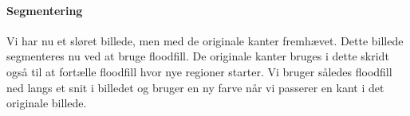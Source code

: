 {\paragraph{Segmentering}
Vi har nu et sløret billede, men med de originale kanter fremhævet.
Dette billede segmenteres nu ved at bruge floodfill. De originale kanter
bruges i dette skridt også til at fortælle floodfill hvor nye regioner
starter. Vi bruger således floodfill ned langs et snit i billedet og
bruger en ny farve når vi passerer en kant i det originale billede.

\begin{figure}[!h]
    \setlength\fboxsep{0pt}
    \setlength\fboxrule{0.5pt}
    \begin{center}
    \end{center}
    \caption[]{}
    \label{sammen_floodfill}
\end{figure}

}

